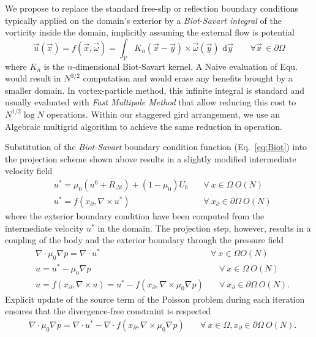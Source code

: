 \documentclass{article}
\begin{document}
We propose to replace the standard free-slip or reflection boundary conditions typically applied on the domain's exterior by a \emph{Biot-Savart integral} of the vorticity inside the domain, implicitly assuming the external flow is potential
\begin{equation}\label{eq:Biot}
    {\vec u}({\vec x}) = f(\vec x,\vec\omega) = \int_{\mathcal{V}}K_{n}({\vec x} - \vec{y})\times \vec\omega({\vec y})\text{ d}\vec{y} \quad\quad \forall \vec x\, \in \partial\Omega
\end{equation}
where $K_n$ is the $n$-dimensional Biot-Savart kernel. A Naive evaluation of Equ.~\theequation~ would result in $N^{3/2}$ computation and would erase any benefits brought by a smaller domain. In vortex-particle method, this infinite integral is standard and usually evaluated with \emph{Fast Multipole Method} that allow reducing this cost to $N^{1/2}\log N$ operations. Within our staggered gird arrangement, we use an Algebraic multigrid algorithm to achieve the same reduction in operation.

Substitution of the \emph{Biot-Savart} boundary condition function (Eq.~\ref{eq:Biot}) into the projection scheme shown above results in a slightly modified intermediate velocity field
\begin{align}
    &u^* = \mu_0(u^0+R_{\Delta t})+(1-\mu_0)U_b &\quad\forall\ x\in\Omega\ O(N) \\
    &u^* = f(x_\partial,\nabla\times u^*) &\quad\forall\ x_\partial\in\partial\Omega\ O(N)
\end{align}
where the exterior boundary condition have been computed from the intermediate velocity $u^*$ in the domain. The projection step, however, results in a coupling of the body and the exterior boundary through the pressure field
\begin{align}
  &\nabla\cdot\mu_0\nabla p = \nabla\cdot u^* &\forall\ x\in\Omega O(N)\\
  &u = u^*-\mu_0\nabla p &\quad\forall\ x\in\Omega\ O(N)\\
  &u = f(x_\partial,\nabla\times u)= u^*-f(x_\partial,\nabla\times\mu_0\nabla p) &\quad\forall\ x_\partial\in\partial\Omega\ O(N).
\end{align}
Explicit update of the source term of the Poisson problem during each iteration ensures that the divergence-free constraint is respected
\begin{align}
    &\nabla\cdot\mu_0\nabla p = \nabla\cdot u^*-\nabla\cdot f(x_\partial,\nabla\times\mu_0\nabla p) &\quad\forall\ x\in\Omega, x_\partial\in\partial\Omega\ O(N).
\end{align}
\end{document}
